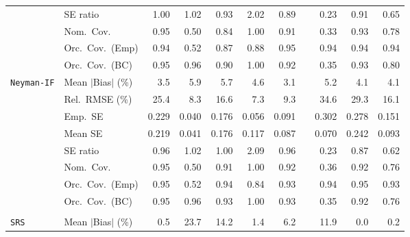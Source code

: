 \begin{landscape}
\begin{longtable}{llrrrrrrrrr}
 & SE ratio & \cellcolor{rankone}1.00 & \cellcolor{ranktwo}1.02 & \cellcolor{rankthree}0.93 & 2.02 & 0.89 &  & 0.23 & 0.91 & 0.65 \\
 & Nom.\ Cov. & \cellcolor{rankone}0.95 & 0.50 & 0.84 & 1.00 & \cellcolor{rankthree}0.91 &  & 0.33 & \cellcolor{ranktwo}0.93 & 0.78 \\
 & Orc.\ Cov.\ (Emp) & \cellcolor{ranktwo}0.94 & 0.52 & 0.87 & \cellcolor{rankthree}0.88 & \cellcolor{rankone}0.95 &  & \cellcolor{ranktwo}0.94 & \cellcolor{ranktwo}0.94 & \cellcolor{ranktwo}0.94 \\
 & Orc.\ Cov.\ (BC) & \cellcolor{rankone}0.95 & \cellcolor{ranktwo}0.96 & 0.90 & 1.00 & 0.92 &  & 0.35 & \cellcolor{rankthree}0.93 & 0.80 \\
\addlinespace[2pt]
\quad \texttt{Neyman-IF} & Mean $|$Bias$|$ (\%) & \cellcolor{ranktwo}3.5 & 5.9 & 5.7 & 4.6 & \cellcolor{rankone}3.1 &  & 5.2 & \cellcolor{rankthree}4.1 & \cellcolor{rankthree}4.1 \\
 & Rel.\ RMSE (\%) & 25.4 & \cellcolor{ranktwo}8.3 & 16.6 & \cellcolor{rankone}7.3 & \cellcolor{rankthree}9.3 &  & 34.6 & 29.3 & 16.1 \\
 & Emp.\ SE & 0.229 & 0.040 & 0.176 & 0.056 & 0.091 &  & 0.302 & 0.278 & 0.151 \\
 & Mean SE & 0.219 & 0.041 & 0.176 & 0.117 & 0.087 &  & 0.070 & 0.242 & 0.093 \\
 & SE ratio & \cellcolor{rankthree}0.96 & \cellcolor{ranktwo}1.02 & \cellcolor{rankone}1.00 & 2.09 & \cellcolor{rankthree}0.96 &  & 0.23 & 0.87 & 0.62 \\
 & Nom.\ Cov. & \cellcolor{rankone}0.95 & 0.50 & \cellcolor{rankthree}0.91 & 1.00 & \cellcolor{ranktwo}0.92 &  & 0.36 & \cellcolor{ranktwo}0.92 & 0.76 \\
 & Orc.\ Cov.\ (Emp) & \cellcolor{rankone}0.95 & 0.52 & \cellcolor{ranktwo}0.94 & 0.84 & \cellcolor{rankthree}0.93 &  & \cellcolor{ranktwo}0.94 & \cellcolor{rankone}0.95 & \cellcolor{rankthree}0.93 \\
 & Orc.\ Cov.\ (BC) & \cellcolor{rankone}0.95 & \cellcolor{ranktwo}0.96 & \cellcolor{rankthree}0.93 & 1.00 & \cellcolor{rankthree}0.93 &  & 0.35 & 0.92 & 0.76 \\
\addlinespace[2pt]
\multicolumn{11}{l}{\textbf{Continuous Phase-One Covariates}} \\
\addlinespace[2pt]
\quad \texttt{SRS} & Mean $|$Bias$|$ (\%) & \cellcolor{rankthree}0.5 & 23.7 & 14.2 & 1.4 & 6.2 &  & 11.9 & \cellcolor{rankone}0.0 & \cellcolor{ranktwo}0.2 \\

\end{longtable}
\end{landscape}
